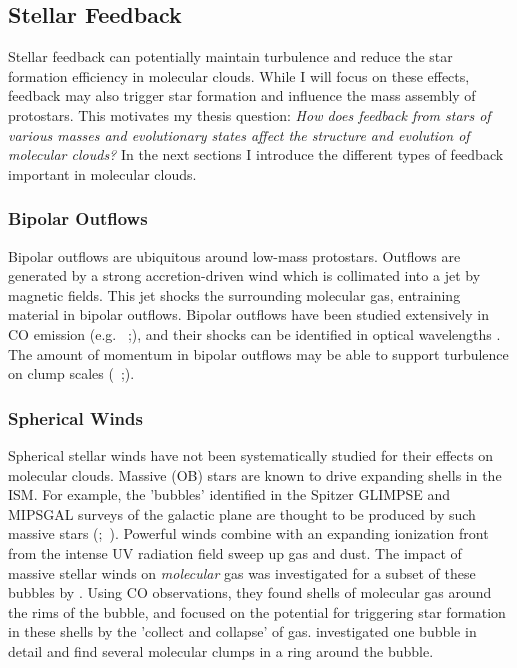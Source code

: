 \subsection{Stellar Feedback}\label{sec:feedback}
Stellar feedback can potentially maintain turbulence and reduce the star formation efficiency in molecular clouds. While I will focus on these effects, feedback may also trigger star formation and influence the mass assembly of protostars. This motivates my thesis question: \textit{How does feedback from stars of various masses and evolutionary states affect the structure and evolution of molecular clouds?} In the next sections I introduce the different types of feedback important in molecular clouds.

\subsubsection{Bipolar Outflows}\label{sec:outflow}
Bipolar outflows are ubiquitous around low-mass protostars. Outflows are generated by a strong accretion-driven wind which is collimated into a jet by magnetic fields. This jet shocks the surrounding molecular gas, entraining material in bipolar outflows. Bipolar outflows have been studied extensively in CO emission (e.g. \citet{Plunkett_2013}~;\cite{Plunkett_2015}), and their shocks can be identified in optical wavelengths \cite{Reipurth_2001}. The amount of momentum in bipolar outflows may be able to support turbulence on clump scales (\citet{Frank14}~;\citet{Offner_2014}).

\subsubsection{Spherical Winds}\label{sec:wind}
Spherical stellar winds have not been systematically studied for their effects on molecular clouds. Massive (OB) stars are known to drive expanding shells in the ISM. For example, the 'bubbles' identified in the Spitzer GLIMPSE and MIPSGAL surveys of the galactic plane are thought to be produced by such massive stars (\citet{Churchwell_2006};~\citet{Beaumont14}). Powerful winds combine with an expanding ionization front from the intense UV radiation field sweep up gas and dust. The impact of massive stellar winds on \textit{molecular} gas was investigated for a subset of these bubbles by \cite{Beaumont_2010}. Using CO observations, they found shells of molecular gas around the rims of the bubble, and focused on the potential for triggering star formation in these shells by the 'collect and collapse' of gas. \citet{Sidorin14} investigated one bubble in detail and find several molecular clumps in a ring around the bubble.

